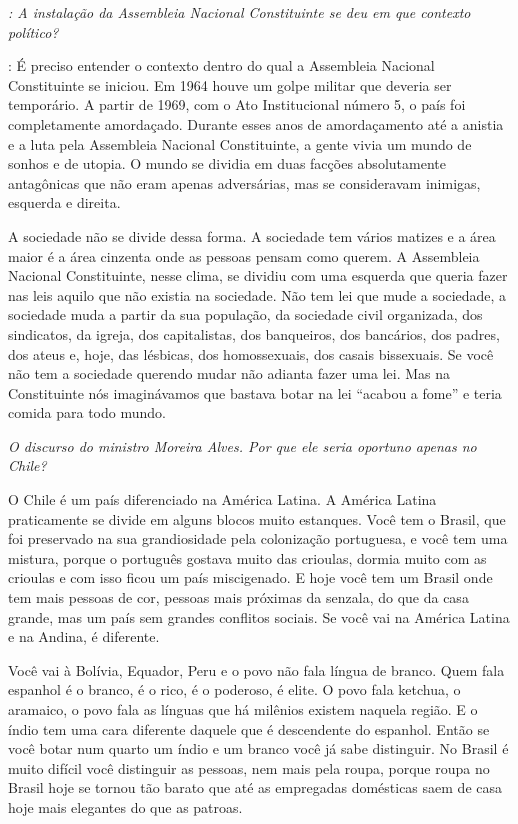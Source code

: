 \emph{: A instalação da Assembleia Nacional Constituinte se deu em que
contexto político?}

: É preciso entender o contexto dentro do qual a
Assembleia Nacional Constituinte se iniciou. Em 1964 houve um golpe
militar que deveria ser temporário. A partir de 1969, com o Ato
Institucional número 5, o país foi completamente amordaçado. Durante
esses anos de amordaçamento até a anistia e a luta pela Assembleia
Nacional Constituinte, a gente vivia um mundo de sonhos e de utopia. O
mundo se dividia em duas facções absolutamente antagônicas que não eram
apenas adversárias, mas se consideravam inimigas, esquerda e direita.

A sociedade não se divide dessa forma. A sociedade tem vários matizes e
a área maior é a área cinzenta onde as pessoas pensam como querem. A
Assembleia Nacional Constituinte, nesse clima, se dividiu com uma
esquerda que queria fazer nas leis aquilo que não existia na sociedade.
Não tem lei que mude a sociedade, a sociedade muda a partir da sua
população, da sociedade civil organizada, dos sindicatos, da igreja, dos
capitalistas, dos banqueiros, dos bancários, dos padres, dos ateus e,
hoje, das lésbicas, dos homossexuais, dos casais bissexuais. Se você não
tem a sociedade querendo mudar não adianta fazer uma lei. Mas na
Constituinte nós imaginávamos que bastava botar na lei ``acabou a
fome'' e teria comida para todo mundo.

\medskip

\noindent\emph{O discurso do ministro Moreira Alves. Por que ele seria oportuno
apenas no Chile?}

O Chile é um país diferenciado na América Latina. A
América Latina praticamente se divide em alguns blocos muito estanques.
Você tem o Brasil, que foi preservado na sua grandiosidade pela
colonização portuguesa, e você tem uma mistura, porque o português
gostava muito das crioulas, dormia muito com as crioulas e com isso
ficou um país miscigenado. E hoje você tem um Brasil onde tem mais
pessoas de cor, pessoas mais próximas da senzala, do que da casa grande,
mas um país sem grandes conflitos sociais. Se você vai na América Latina
e na Andina, é diferente.

Você vai à Bolívia, Equador, Peru e o povo não fala língua de branco. Quem
fala espanhol é o branco, é o rico, é o poderoso, é elite. O povo fala
ketchua, o aramaico, o povo fala as línguas que há milênios existem
naquela região. E o índio tem uma cara diferente daquele que é
descendente do espanhol. Então se você botar num quarto um índio e um
branco você já sabe distinguir. No Brasil é muito difícil você
distinguir as pessoas, nem mais pela roupa, porque roupa no Brasil hoje
se tornou tão barato que até as empregadas domésticas saem de casa hoje
mais elegantes do que as patroas.

